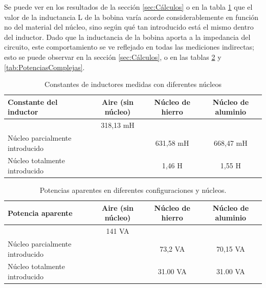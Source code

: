 \documentclass{article}
\begin{document}
            Se puede ver en los resultados de la sección \ref{sec:Cálculos} o en la tabla \ref{tab:ConstantesDelInductor} que el valor de la inductancia L de la bobina varía acorde considerablemente en función no del material del núcleo, sino según qué tan introducido está el mismo dentro del inductor. Dado que la inductancia de la bobina aporta a la impedancia del circuito, este comportamiento se ve reflejado en todas las mediciones indirectas; esto se puede observar en la sección \ref{sec:Cálculos}, o en las tablas \ref{tab:PotenciasAparentes} y \ref{tab:PotenciasComplejas}.
            
             \begin{table}[H]
                \centering
                \begin{tabular}{|l|c|c|c|}
                \hline
                Constante del inductor               & Aire (sin núcleo)     & Núcleo de hierro & Núcleo de aluminio \\ \hline
                                                    & 318,13 mH             &                  &                     \\ \hline
                Núcleo parcialmente introducido     &                        & 631,58 mH        & 668,47 mH            \\ \hline
                Núcleo totalmente introducido       &                        & 1,46 H          & 1,55 H                \\ \hline
                \end{tabular}
                \caption{Constantes de inductores medidas con diferentes núcleos}
                \label{tab:ConstantesDelInductor}
            \end{table}

            
            \begin{table}[H]
                \centering
                \begin{tabular}{|l|c|c|c|}
                \hline
                Potencia aparente                    & Aire (sin núcleo)  & Núcleo de hierro & Núcleo de aluminio \\ \hline
                                                    & 141 VA             &                  &                     \\ \hline
                Núcleo parcialmente introducido     &                    &  73,2 VA         &  70,15 VA           \\ \hline
                Núcleo totalmente introducido       &                    &  31.00 VA        &  31.00 VA           \\ \hline
                \end{tabular}
                \caption{Potencias aparentes  en diferentes configuraciones y núcleos.}
                \label{tab:PotenciasAparentes}
            \end{table}
\end{document}

